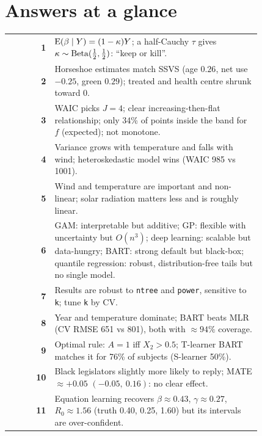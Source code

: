 \documentclass[11pt]{article}
\begin{document}

\tableofcontents
\clearpage

\section*{Answers at a glance}
\begin{center}
\small
\renewcommand{\arraystretch}{1.25}
\begin{tabular}{>{\bfseries\color{navy}}r p{0.82\linewidth}}\toprule
1  & $\mathrm{E}(\beta\mid Y)=(1-\kappa)Y$; a half-Cauchy $\tau$ gives $\kappa\sim\mathrm{Beta}(\frac12,\frac12)$: ``keep or kill''.\\
2  & Horseshoe estimates match SSVS (age $0.26$, net use $-0.25$, green $0.29$); treated and health centre shrunk toward 0.\\
3  & WAIC picks $J=4$; clear increasing-then-flat relationship; only 34\% of points inside the band for $f$ (expected); not monotone.\\
4  & Variance grows with temperature and falls with wind; heteroskedastic model wins (WAIC 985 vs 1001).\\
5  & Wind and temperature are important and non-linear; solar radiation matters less and is roughly linear.\\
6  & GAM: interpretable but additive; GP: flexible with uncertainty but $O(n^3)$; deep learning: scalable but data-hungry; BART: strong default but black-box; quantile regression: robust, distribution-free tails but no single model.\\
7  & Results are robust to \texttt{ntree} and \texttt{power}, sensitive to \texttt{k}; tune \texttt{k} by CV.\\
8  & Year and temperature dominate; BART beats MLR (CV RMSE 651 vs 801), both with $\approx94\%$ coverage.\\
9  & Optimal rule: $A=1$ iff $X_2>0.5$; T-learner BART matches it for 76\% of subjects (S-learner 50\%).\\
10 & Black legislators slightly more likely to reply; MATE $\approx+0.05$ $(-0.05,\ 0.16)$: no clear effect.\\
11 & Equation learning recovers $\beta\approx0.43$, $\gamma\approx0.27$, $R_0\approx1.56$ (truth 0.40, 0.25, 1.60) but its intervals are over-confident.\\\bottomrule
\end{tabular}
\end{center}
\clearpage
\end{document}
